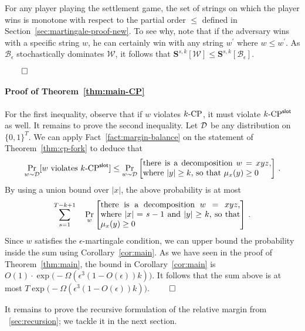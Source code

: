 For any player playing the settlement game, 
the set of strings on which the player wins is monotone 
with respect to the partial order $\leq$ defined in Section~\ref{sec:martingale-proof-new}. 
To see why, note that if the adversary wins with a specific string $w$, 
he can certainly win with any string $w^\prime$ where $w \leq w^\prime$. 
As $\mathcal{B}_\epsilon$ stochastically dominates $\mathcal{W}$, it follows that 
$
  \mathbf{S}^{s,k}[\mathcal{W}] \leq \mathbf{S}^{s,k}[\mathcal{B}_\epsilon]
$.

\hfill$\qed$


\paragraph{Proof of Theorem~\ref{thm:main-CP}}
For the first inequality, observe that if $w$ violates ${k}\text{-}\mathrm{CP}$, it must violate ${k}\text{-}\mathrm{CP}^{\mathsf{slot}}$ as well. 
It remains to prove the second inequality. 
Let $\mathcal{D}$ be any distribution on $\{0,1\}^T$. 
We can apply Fact~\ref{fact:margin-balance} on the statement of Theorem~\ref{thm:cp-fork} 
to deduce that 
\begin{equation*}\label{eq:main-argument-1}
  \Pr_{w \sim \Distribution}[\text{$w$ violates $\kSlotCP$}] 
    \leq 
    \Pr_{w \sim \Distribution}\left[\parbox{55mm}{
      there is a decomposition $w = xyz$, 
      where $|y| \geq k$, 
      so that $\mu_x(y) \geq 0$ 
    } \right] 
    \,.
\end{equation*}
By using a union bound over $|x|$, the above probability is at most 
\[
    \sum_{s = 1}^{T - k + 1} 
    \quad 
      \Pr_w\left[\parbox{60mm}{
        there is a decomposition $w = xyz$, 
        where $|x| = s - 1$ and $|y| \geq k$, 
        so that $\mu_x(y) \geq 0$ 
      }\right] 
    \,.
\]
Since $w$ satisfies the $\epsilon$-martingale condition, 
we can upper bound the probability inside the sum 
using Corollary~\ref{cor:main}. 
As we have seen in the proof of Theorem~\ref{thm:main}, 
the bound in Corollary~\ref{cor:main} is 
$
  O(1) \cdot \exp\bigl(-\Omega(\epsilon^3 (1 - O(\epsilon))k)\bigr)
$.
It follows that the sum above is at most $T \exp\bigl(-\Omega(\epsilon^3 (1 - O(\epsilon))k)\bigr)$.
\hfill $\qed$


It remains to prove the recursive formulation of the relative margin 
from \Section~\ref{sec:recursion}; 
we tackle it in the next section.



